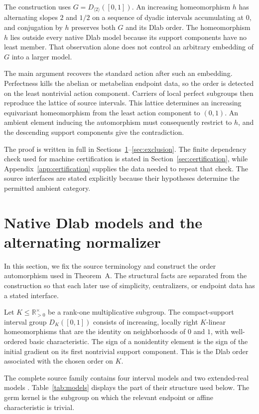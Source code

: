 \documentclass[11pt]{amsart}
\theoremstyle{definition}
\theoremstyle{remark}
\numberwithin{equation}{section}
\begin{document}
The construction uses \(G=D_{\langle 2\rangle}([0,1])\). An increasing homeomorphism \(h\) has alternating slopes \(2\) and \(1/2\) on a sequence of dyadic intervals accumulating at \(0\), and conjugation by \(h\) preserves both \(G\) and its Dlab order. The homeomorphism \(h\) lies outside every native Dlab model because its support components have no least member. That observation alone does not control an arbitrary embedding of \(G\) into a larger model.

The main argument recovers the standard action after such an embedding. Perfectness kills the abelian or metabelian endpoint data, so the order is detected on the least nontrivial action component. Carriers of local perfect subgroups then reproduce the lattice of source intervals. This lattice determines an increasing equivariant homeomorphism from the least action component to \((0,1)\). An ambient element inducing the automorphism must consequently restrict to \(h\), and the descending support components give the contradiction.

The proof is written in full in Sections~\ref{sec:prelim}--\ref{sec:exclusion}. The finite dependency check used for machine certification is stated in Section~\ref{sec:certification}, while Appendix~\ref{app:certification} supplies the data needed to repeat that check. The source interfaces are stated explicitly because their hypotheses determine the permitted ambient category.

\section{Native Dlab models and the alternating normalizer}
\label{sec:prelim}

In this section, we fix the source terminology and construct the order automorphism used in Theorem~A. The structural facts are separated from the construction so that each later use of simplicity, centralizers, or endpoint data has a stated interface.

Let \(K\leq \mathbb R_{>0}^{\times}\) be a rank-one multiplicative subgroup. The compact-support interval group \(D_K([0,1])\) consists of increasing, locally right \(K\)-linear homeomorphisms that are the identity on neighborhoods of \(0\) and \(1\), with well-ordered basic characteristic. The sign of a nonidentity element is the sign of the initial gradient on its first nontrivial support component. This is the Dlab order associated with the chosen order on \(K\).

The complete source family contains four interval models and two extended-real models \cite{Medvedev2001,ZenkovMedvedev}. Table~\ref{tab:models} displays the part of their structure used below. The germ kernel is the subgroup on which the relevant endpoint or affine characteristic is trivial.
\end{document}
